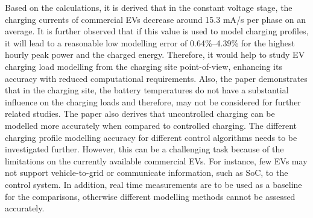 	Based on the calculations, it is derived that in the constant voltage stage, the charging currents of commercial EVs decrease around 15.3 mA/s per phase on an average. It is further observed that if this value is used to model charging profiles, it will lead to a reasonable low modelling error of 0.64\%–4.39\% for the highest hourly peak power and the charged energy. 
	Therefore, it would help to study EV charging load modelling from the charging site point-of-view, enhancing its accuracy with reduced computational requirements. Also, the paper demonstrates that in the charging site, the battery temperatures do not have a substantial influence on the charging loads and therefore, may not be considered for further related studies.
	The paper also derives that uncontrolled charging can be modelled more accurately when compared to  controlled charging. The different charging profile modelling  accuracy for different control algorithms needs to be investigated further. However, this can be a challenging task because of the limitations on the currently available commercial EVs. For instance, few EVs may not support vehicle-to-grid or  communicate information, such as SoC, to the control system. In addition, real time measurements are to be used as a baseline for the comparisons, otherwise different modelling methods cannot be assessed accurately.
	